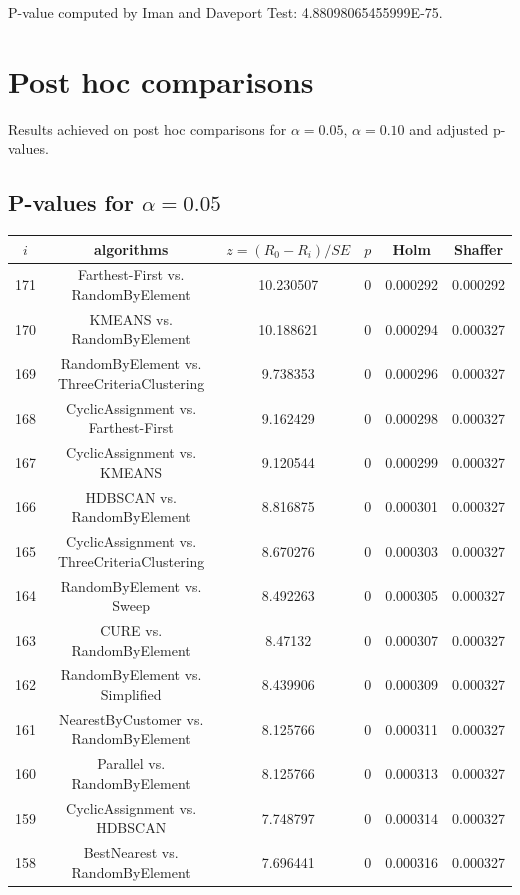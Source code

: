 \documentclass[a4paper,10pt]{article}
\begin{document}
\begin{landscape}
P-value computed by Iman and Daveport Test: 4.88098065455999E-75.\newline



\pagebreak

\section{Post hoc comparisons}

Results achieved on post hoc comparisons for $\alpha = 0.05$, $\alpha = 0.10$ and adjusted p-values.

\subsection{P-values for $\alpha=0.05$}

\begin{table}[!htp]
\centering\scriptsize
\begin{tabular}{cccccc}
$i$&algorithms&$z=(R_0 - R_i)/SE$&$p$&Holm&Shaffer\\
\hline171&Farthest-First vs. RandomByElement&10.230507&0&0.000292&0.000292\\
170&KMEANS vs. RandomByElement&10.188621&0&0.000294&0.000327\\
169&RandomByElement vs. ThreeCriteriaClustering&9.738353&0&0.000296&0.000327\\
168&CyclicAssignment vs. Farthest-First&9.162429&0&0.000298&0.000327\\
167&CyclicAssignment vs. KMEANS&9.120544&0&0.000299&0.000327\\
166&HDBSCAN vs. RandomByElement&8.816875&0&0.000301&0.000327\\
165&CyclicAssignment vs. ThreeCriteriaClustering&8.670276&0&0.000303&0.000327\\
164&RandomByElement vs. Sweep&8.492263&0&0.000305&0.000327\\
163&CURE vs. RandomByElement&8.47132&0&0.000307&0.000327\\
162&RandomByElement vs. Simplified&8.439906&0&0.000309&0.000327\\
161&NearestByCustomer vs. RandomByElement&8.125766&0&0.000311&0.000327\\
160&Parallel vs. RandomByElement&8.125766&0&0.000313&0.000327\\
159&CyclicAssignment vs. HDBSCAN&7.748797&0&0.000314&0.000327\\
158&BestNearest vs. RandomByElement&7.696441&0&0.000316&0.000327\\

\end{tabular}
\end{table}
\end{landscape}
\end{document}
